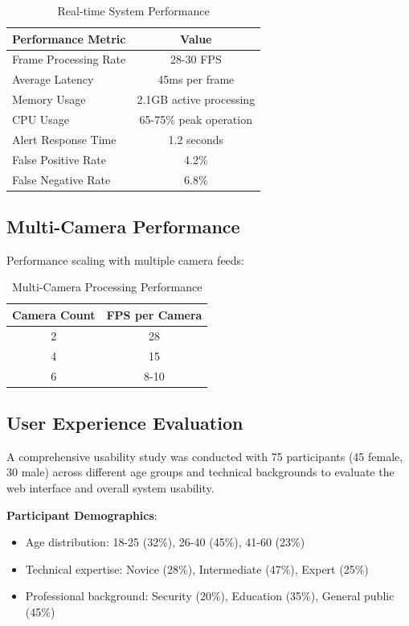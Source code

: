 \documentclass[12pt,a4paper]{article}
\begin{document}
\begin{table}[h]
\centering
\begin{tabular}{|l|c|}
\hline
\textbf{Performance Metric} & \textbf{Value} \\
\hline
Frame Processing Rate & 28-30 FPS \\
\hline
Average Latency & 45ms per frame \\
\hline
Memory Usage & 2.1GB active processing \\
\hline
CPU Usage & 65-75\% peak operation \\
\hline
Alert Response Time & 1.2 seconds \\
\hline
False Positive Rate & 4.2\% \\
\hline
False Negative Rate & 6.8\% \\
\hline
\end{tabular}
\caption{Real-time System Performance}
\label{tab:system-performance}
\end{table}

\subsection{Multi-Camera Performance}
Performance scaling with multiple camera feeds:

\begin{table}[h]
\centering
\begin{tabular}{|c|c|}
\hline
\textbf{Camera Count} & \textbf{FPS per Camera} \\
\hline
2 & 28 \\
\hline
4 & 15 \\
\hline
6 & 8-10 \\
\hline
\end{tabular}
\caption{Multi-Camera Processing Performance}
\end{table}

\subsection{User Experience Evaluation}

A comprehensive usability study was conducted with 75 participants (45 female, 30 male) across different age groups and technical backgrounds to evaluate the web interface and overall system usability.

\textbf{Participant Demographics}:
\begin{itemize}
    \item Age distribution: 18-25 (32\%), 26-40 (45\%), 41-60 (23\%)
    \item Technical expertise: Novice (28\%), Intermediate (47\%), Expert (25\%)
    \item Professional background: Security (20\%), Education (35\%), General public (45\%)
\end{itemize}
\end{document}

